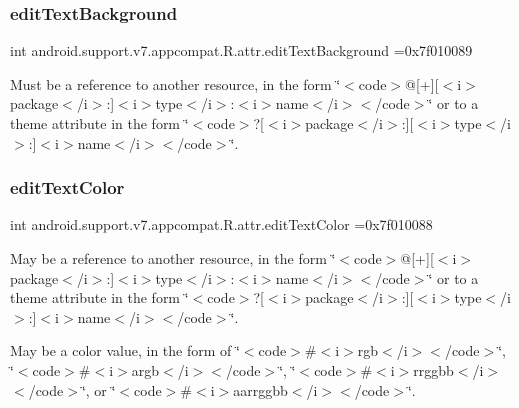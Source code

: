 \subsubsection{\texorpdfstring{edit\+Text\+Background}{editTextBackground}}
{\footnotesize\ttfamily int android.\+support.\+v7.\+appcompat.\+R.\+attr.\+edit\+Text\+Background =0x7f010089\hspace{0.3cm}{\ttfamily [static]}}

Must be a reference to another resource, in the form \char`\"{}$<$code$>$@\mbox{[}+\mbox{]}\mbox{[}$<$i$>$package$<$/i$>$\+:\mbox{]}$<$i$>$type$<$/i$>$\+:$<$i$>$name$<$/i$>$$<$/code$>$\char`\"{} or to a theme attribute in the form \char`\"{}$<$code$>$?\mbox{[}$<$i$>$package$<$/i$>$\+:\mbox{]}\mbox{[}$<$i$>$type$<$/i$>$\+:\mbox{]}$<$i$>$name$<$/i$>$$<$/code$>$\char`\"{}. \mbox{\label{classandroid_1_1support_1_1v7_1_1appcompat_1_1R_1_1attr_ae11656aa9c64037231331f234774b280}} 
\subsubsection{\texorpdfstring{edit\+Text\+Color}{editTextColor}}
{\footnotesize\ttfamily int android.\+support.\+v7.\+appcompat.\+R.\+attr.\+edit\+Text\+Color =0x7f010088\hspace{0.3cm}{\ttfamily [static]}}

May be a reference to another resource, in the form \char`\"{}$<$code$>$@\mbox{[}+\mbox{]}\mbox{[}$<$i$>$package$<$/i$>$\+:\mbox{]}$<$i$>$type$<$/i$>$\+:$<$i$>$name$<$/i$>$$<$/code$>$\char`\"{} or to a theme attribute in the form \char`\"{}$<$code$>$?\mbox{[}$<$i$>$package$<$/i$>$\+:\mbox{]}\mbox{[}$<$i$>$type$<$/i$>$\+:\mbox{]}$<$i$>$name$<$/i$>$$<$/code$>$\char`\"{}. 

May be a color value, in the form of \char`\"{}$<$code$>$\#$<$i$>$rgb$<$/i$>$$<$/code$>$\char`\"{}, \char`\"{}$<$code$>$\#$<$i$>$argb$<$/i$>$$<$/code$>$\char`\"{}, \char`\"{}$<$code$>$\#$<$i$>$rrggbb$<$/i$>$$<$/code$>$\char`\"{}, or \char`\"{}$<$code$>$\#$<$i$>$aarrggbb$<$/i$>$$<$/code$>$\char`\"{}. \mbox{\label{classandroid_1_1support_1_1v7_1_1appcompat_1_1R_1_1attr_a74d4dc05fa3ea797344808fee27b9ee2}} 
